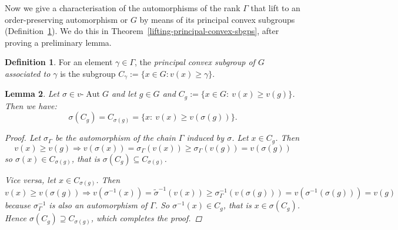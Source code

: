 \documentclass[12pt,a4paper,reqno,openright]{amsart}
\newcommand{\Ra}{\Rightarrow}
\renewcommand{\1}{\mathbbm{1}}
\DeclareMathOperator{\Aut}{Aut}
\newcommand{\vAut}{v\text{-}\Aut}
\theoremstyle{definition}
\newtheorem{defn}{Definition}[section]
\theoremstyle{plain}
\newtheorem{lemma}[defn]{Lemma}
\theoremstyle{plain}
\theoremstyle{plain}
\theoremstyle{plain}
\theoremstyle{plain}
\theoremstyle{plain}
\theoremstyle{plain}
\theoremstyle{plain}
\theoremstyle{definition}
\theoremstyle{definition}
\theoremstyle{plain}
\theoremstyle{definition}
\theoremstyle{definition}
\theoremstyle{plain}
\theoremstyle{plain}
\theoremstyle{plain}
\begin{document}
Now we give a characterisation of the automorphisms of the rank $ \Gamma $ that lift to an order-preserving automorphism or $ G $ by means of its principal convex subgroups (Definition~\ref{def:princ-convex-sbg}). We do this in
Theorem~\ref{lifting-principal-convex-sbgps}, after proving a preliminary lemma.
\begin{defn}\label{def:princ-convex-sbg}
	For an element $ \gamma\in\Gamma $, the \emph{principal convex subgroup of $ G $ associated to $ \gamma $} is the subgroup $ C_\gamma := \{x\in G : v(x)\geq \gamma \} $.
\end{defn}
\begin{lemma}
	\label{h-commutes-C}
	Let $\sigma\in\vAut G$ and let $g\in G$ and $C_g := \{x\in G:\ v(x)\geq v(g)\}$. Then we have:
	$$\sigma(C_g) = C_{\sigma(g)} = \{x:\ v(x) \geq v(\sigma(g))\}.$$
	\begin{proof}
		Let $ \sigma_\Gamma$ be the automorphism of the chain $\Gamma$ induced by $\sigma$.
		Let $x\in C_g$. Then
		$$v(x)\geq v(g) \Ra v(\sigma(x)) = \sigma_\Gamma (v(x)) \geq \sigma_\Gamma (v(g)) = v(\sigma(g))$$
		so $\sigma(x) \in C_{\sigma(g)}$, that is $\sigma(C_g) \subseteq C_{\sigma(g)}$.
		
		Vice versa, let $x\in C_{\sigma(g)}$. Then
		$$
		v(x) \geq v(\sigma(g)) \Ra
		v(\sigma^{-1}(x)) = \tilde \sigma^{-1}(v(x)) \geq \sigma_\Gamma^{-1}(v(\sigma(g)))= v(\sigma^{-1}(\sigma(g)))=v(g)
		$$
		because $\sigma_\Gamma^{-1}$ is also an automorphism of $\Gamma$.
		So $\sigma^{-1}(x) \in C_g$, that is $x\in \sigma(C_g)$.
		Hence $\sigma(C_g) \supseteq C_{\sigma(g)}$, which completes the proof.
	\end{proof}
\end{lemma}
\end{document}
